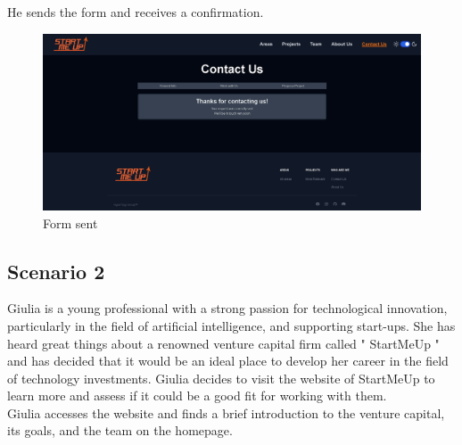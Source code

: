 \documentclass[11pt, letterpaper]{article}
\begin{document}
\noindent
He sends the form and receives a confirmation.
\begin{figure}[H]
    \centering
    \includegraphics[width=16cm]{images/Scenarios/Scenario 1/Screen9.png}
    \caption{Form sent}
    \label{fig:scenario1_9}
\end{figure}

\subsection{Scenario 2}
Giulia is a young professional with a strong passion for technological innovation, particularly in the field of artificial intelligence, and supporting start-ups. She has heard great things about a renowned venture capital firm called " StartMeUp " and has decided that it would be an ideal place to develop her career in the field of technology investments. Giulia decides to visit the website of StartMeUp to learn more and assess if it could be a good fit for working with them.\\
Giulia accesses the website and finds a brief introduction to the venture capital, its goals, and the team on the homepage.\\
\end{document}

